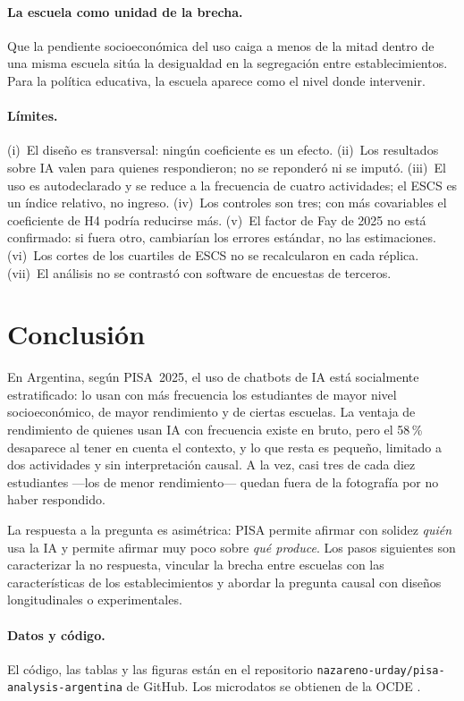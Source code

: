 \documentclass[11pt,a4paper]{article}
\begin{document}
\paragraph{La escuela como unidad de la brecha.} Que la pendiente socioeconómica del uso caiga a menos de la mitad dentro de una misma escuela sitúa la desigualdad en la segregación entre establecimientos. Para la política educativa, la escuela aparece como el nivel donde intervenir.

\paragraph{Límites.} (i)~El diseño es transversal: ningún coeficiente es un efecto. (ii)~Los resultados sobre IA valen para quienes respondieron; no se reponderó ni se imputó. (iii)~El uso es autodeclarado y se reduce a la frecuencia de cuatro actividades; el ESCS es un índice relativo, no ingreso. (iv)~Los controles son tres; con más covariables el coeficiente de H4 podría reducirse más. (v)~El factor de Fay de 2025 no está confirmado: si fuera otro, cambiarían los errores estándar, no las estimaciones. (vi)~Los cortes de los cuartiles de ESCS no se recalcularon en cada réplica. (vii)~El análisis no se contrastó con software de encuestas de terceros.

\section{Conclusión}\label{sec:conclusion}

En Argentina, según PISA~2025, el uso de chatbots de IA está socialmente estratificado: lo usan con más frecuencia los estudiantes de mayor nivel socioeconómico, de mayor rendimiento y de ciertas escuelas. La ventaja de rendimiento de quienes usan IA con frecuencia existe en bruto, pero el 58\,\% desaparece al tener en cuenta el contexto, y lo que resta es pequeño, limitado a dos actividades y sin interpretación causal. A la vez, casi tres de cada diez estudiantes ---los de menor rendimiento--- quedan fuera de la fotografía por no haber respondido.

La respuesta a la pregunta es asimétrica: PISA permite afirmar con solidez \emph{quién} usa la IA y permite afirmar muy poco sobre \emph{qué produce}. Los pasos siguientes son caracterizar la no respuesta, vincular la brecha entre escuelas con las características de los establecimientos y abordar la pregunta causal con diseños longitudinales o experimentales.

\paragraph{Datos y código.} El código, las tablas y las figuras están en el repositorio \texttt{nazareno-urday/pisa-analysis-argentina} de GitHub. Los microdatos se obtienen de la OCDE \parencite{oecd2025db}.

\printbibliography[title={Referencias}]
\end{document}
